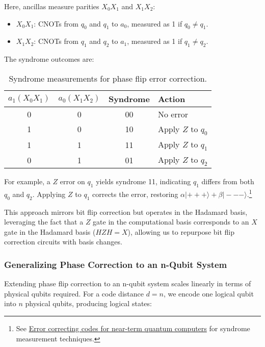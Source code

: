Here, ancillas measure parities \( X_0 X_1 \) and \( X_1 X_2 \):
\begin{itemize}
  \item \( X_0 X_1 \): CNOTs from \( q_0 \) and \( q_1 \) to \( a_0 \),
    measured as 1 if \( q_0 \neq q_1 \).
  \item \( X_1 X_2 \): CNOTs from \( q_1 \) and \( q_2 \) to \( a_1 \),
    measured as 1 if \( q_1 \neq q_2 \).
\end{itemize}

The syndrome outcomes are:

\begin{table}[H]
  \centering
  \begin{tabular}{cccl}
    \toprule
    \( a_1  (X_0 X_1) \) & \( a_0  (X_1 X_2) \) & Syndrome & Action \\
    \midrule
    0 & 0 & 00 & No error \\
    1 & 0 & 10 & Apply \( Z \) to \( q_0 \) \\
    1 & 1 & 11 & Apply \( Z \) to \( q_1 \) \\
    0 & 1 & 01 & Apply \( Z \) to \( q_2 \) \\
    \bottomrule
  \end{tabular}
  \caption{Syndrome measurements for phase flip error correction.}
\end{table}

For example, a \( Z \) error on \( q_1 \) yields syndrome 11, indicating \(
q_1 \) differs from both \( q_0 \) and \( q_2 \). Applying \( Z \) to \( q_1
\) corrects the error, restoring \( \alpha |+++\rangle + \beta |---\rangle
\).\footnote{See \href{https://www.ibm.com/quantum/blog/error-correction-codes}
{Error correcting codes for near-term quantum computers} for syndrome
measurement techniques.}

This approach mirrors bit flip correction but operates in the Hadamard basis,
leveraging the fact that a \( Z \) gate in the computational basis
corresponds to an \( X \) gate in the Hadamard basis (\( H Z H = X \)),
allowing us to repurpose bit flip correction circuits with basis changes.

\subsubsection*{Generalizing Phase Correction to an n-Qubit System}

Extending phase flip correction to an n-qubit system scales linearly in terms
of physical qubits required. For a code distance \( d = n \), we encode one
logical qubit into \( n \) physical qubits, producing logical states:


